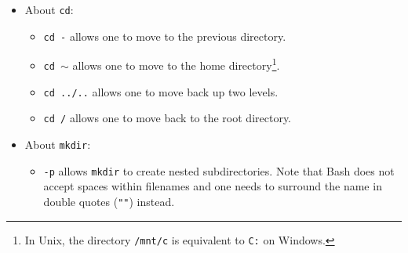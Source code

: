 \documentclass[UTF8]{book}
\newcommand{\code}[1]{\colorbox{codegray}{\texttt{#1}}}
\begin{document}
\begin{itemize}
\begin{itemize}
	\item \code{-r} lists the contents of a directory in reverse order.
	\item \code{-s} displays the size of files and directories alongside the names.
	\item \code{-S} sorts the files and directories by size.
	\item \code{-R} lists all nested subdirectories within a directory.
	\item \code{-a}\footnote{Note that in most command line tools, multiple options can be combined with a single \code{-} and no spaces between the options (e.g.: \code{ls -F -a} is equivalent to \code{ls -Fa}).} lists ALL directories, where
	\begin{itemize}
		\item \code{./} refers to the current working directory.
		\item \code{../} refers to the parent directory.
	\end{itemize}
	One may also see other files starting with a dot (e.g.: \code{.bash\_profile}). These files usually contain shell (or other programs) configuration settings. The prefix \code{.} is used to prevent these configuration files from cluttering the terminal when a standard \code{ls} command is used.
	\item \code{ls} can be given multiple paths at once.
\end{itemize}
\code{ls Desktop} can also output the list of contents of a different directory. Pressing \code{Tab} twice more after a complete directory to see all of those files in the target directory. 
\item About \code{cd}:
\begin{itemize}
	\item \code{cd -} allows one to move to the previous directory.
	\item \code{cd $\sim$} allows one to move to the home directory\footnote{In Unix, the directory \code{/mnt/c} is equivalent to \code{C:} on Windows.}.
	\item \code{cd ../..} allows one to move back up two levels.
	\item \code{cd /} allows one to move back to the root directory.
\end{itemize}
\item About \code{mkdir}:
\begin{itemize}
	\item \code{-p} allows \code{mkdir} to create nested subdirectories. Note that Bash does not accept spaces within filenames and one needs to surround the name in double quotes (\code{""}) instead.

\end{itemize}
\end{itemize}
\end{document}
